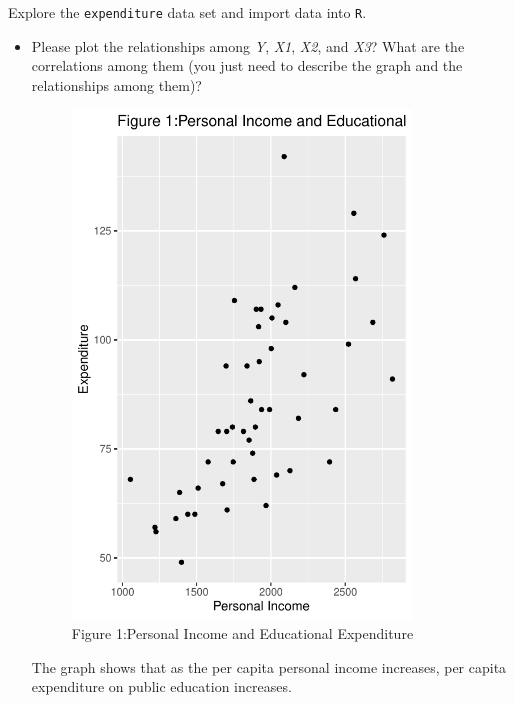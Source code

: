 \documentclass[12pt,letterpaper]{article}
\begin{document}
	\vspace{.5cm}
	\noindent Explore the \texttt{expenditure} data set and import data into \texttt{R}.
	\vspace{.5cm}
	  
	\vspace{.5cm}
	\begin{itemize}
		
		\item
		Please plot the relationships among \emph{Y}, \emph{X1}, \emph{X2}, and \emph{X3}? What are the correlations among them (you just need to describe the graph and the relationships among them)?
		\vspace{.5cm}
		
		  
		\vspace{.5cm}
		\begin{figure}\centering
		\caption{Figure 1:Personal Income and Educational Expenditure}
		\includegraphics[width=0.85\textwidth]{Rplot1.pdf}
	    \end{figure}	
		The graph shows that as the per capita personal income increases, per capita expenditure on public education increases.
		\vspace{.5cm}
		

\end{itemize}
\end{document}
